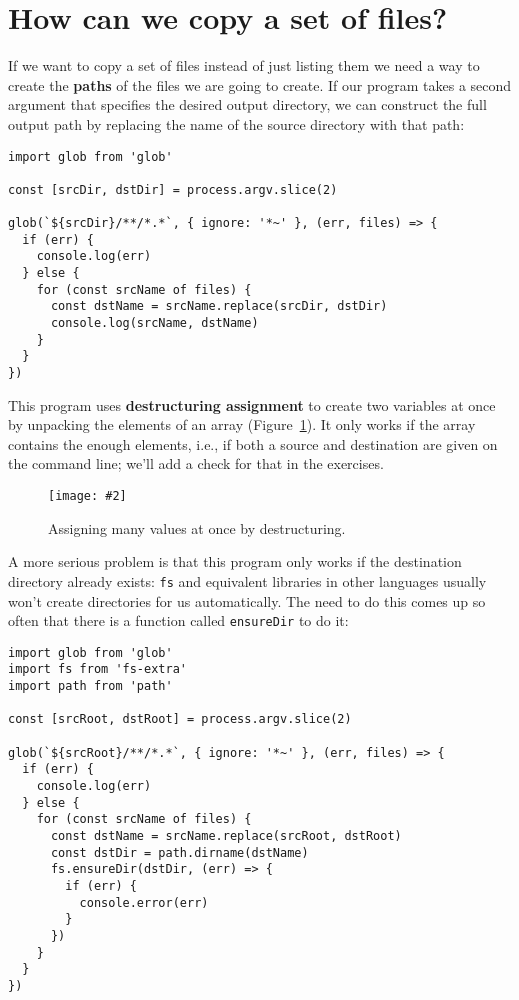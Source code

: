 \documentclass[krantzl]{krantz}
\newcommand{\figpdf}[4]{\begin{figure}%
\centering%
\texttt{[image: \#2]}%
\caption{#3}%
\label{#1}%
\end{figure}}
\newcommand{\figref}[1]{Figure~\ref{#1}}
\newcommand{\glossref}[1]{\textbf{#1}}
\begin{document}
\section{How can we copy a set of files?}\label{systems-programming-copy}


If we want to copy a set of files instead of just listing them
we need a way to create the \glossref{paths} of the files we are going to create.
If our program takes a second argument that specifies the desired output directory,
we can construct the full output path by replacing the name of the source directory with that path:


\begin{lstlisting}[frame=single,frameround=tttt]
import glob from 'glob'

const [srcDir, dstDir] = process.argv.slice(2)

glob(`${srcDir}/**/*.*`, { ignore: '*~' }, (err, files) => {
  if (err) {
    console.log(err)
  } else {
    for (const srcName of files) {
      const dstName = srcName.replace(srcDir, dstDir)
      console.log(srcName, dstName)
    }
  }
})
\end{lstlisting}



\noindent This program uses \glossref{destructuring assignment}
to create two variables at once
by unpacking the elements of an array
(\figref{systems-programming-destructuring-assignment}).
It only works if the array contains the enough elements,
i.e.,
if both a source and destination are given on the command line;
we'll add a check for that in the exercises.

\figpdf{systems-programming-destructuring-assignment}{./systems-programming/destructuring-assignment.pdf}{Assigning many values at once by destructuring.}{0.6}


A more serious problem is that
this program only works if the destination directory already exists:
\texttt{fs} and equivalent libraries in other languages usually won't create directories for us automatically.
The need to do this comes up so often that there is a function called \texttt{ensureDir} to do it:


\begin{lstlisting}[frame=single,frameround=tttt]
import glob from 'glob'
import fs from 'fs-extra'
import path from 'path'

const [srcRoot, dstRoot] = process.argv.slice(2)

glob(`${srcRoot}/**/*.*`, { ignore: '*~' }, (err, files) => {
  if (err) {
    console.log(err)
  } else {
    for (const srcName of files) {
      const dstName = srcName.replace(srcRoot, dstRoot)
      const dstDir = path.dirname(dstName)
      fs.ensureDir(dstDir, (err) => {
        if (err) {
          console.error(err)
        }
      })
    }
  }
})
\end{lstlisting}
\end{document}
